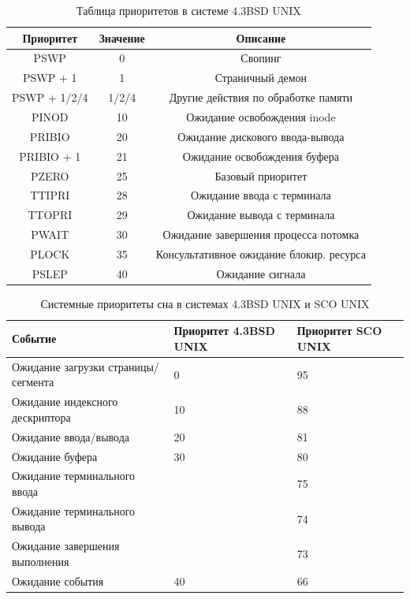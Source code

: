 \documentclass[a4paper,oneside,14pt]{extarticle}
\begin{document}
\newpage
\begin{table}[h]
    \caption{Таблица приоритетов в системе 4.3BSD UNIX}
	\label{tab:bsd}
	\begin{center}
		\begin{tabular}{ |c|c|c|  }
			\hline
			{Приоритет} & {Значение} & {Описание} \\
			\hline
			{PSWP} & 0 & Свопинг \\
			\hline
			{PSWP + 1} & 1 & Страничный демон \\
			\hline
			{PSWP + 1/2/4} & 1/2/4 & Другие действия по обработке памяти \\
			\hline
			{PINOD} & 10 & Ожидание освобождения inode \\
			\hline
			{PRIBIO} & 20 & Ожидание дискового ввода-вывода \\
			\hline
			{PRIBIO + 1} & 21 & Ожидание освобождения буфера \\
			\hline
			{PZERO} & 25 & Базовый приоритет \\
			\hline
			{TTIPRI} & 28 & Ожидание ввода с терминала \\
			\hline
			{TTOPRI} & 29 & Ожидание вывода с терминала \\
			\hline 
			{PWAIT} & 30 & Ожидание завершения процесса потомка \\
			\hline
			{PLOCK} & 35 & Консультативное ожидание блокир. ресурса \\
			\hline
			{PSLEP} & 40 & Ожидание сигнала \\
			\hline
		\end{tabular}
	\end{center}
\end{table}

\begin{table}[h]
    \caption{Системные приоритеты сна в системах 4.3BSD UNIX и SCO UNIX \cite[c.~263]{unixrob}}
	\begin{center}
		\begin{tabular}{|l|p{75pt}|p{75pt}|} 
			\hline
			{Событие} & {Приоритет 4.3BSD UNIX} & {Приоритет SCO UNIX}\\
			\hline
			{Ожидание загрузки страницы/сегмента} & 0 & 95\\
			\hline
			{Ожидание индексного дескриптора} & 10 & 88\\
			\hline
			{Ожидание ввода/вывода} & 20 & 81 \\
			\hline
			{Ожидание буфера} & 30 & 80\\
			\hline
			{Ожидание терминального ввода} &    & 75\\
			\hline
			{Ожидание терминального вывода} &    & 74\\
			\hline
			{Ожидание завершения выполнения} &    & 73\\
			\hline
			{Ожидание события} & 40 & 66\\
			\hline
		\end{tabular}
	\end{center}
	\label{tbl:sleeppriority}
\end{table}
\end{document}
